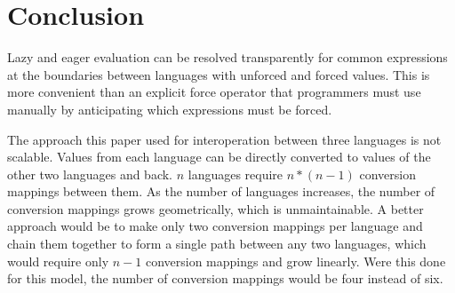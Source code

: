 \section{Conclusion}

Lazy and eager evaluation can be resolved transparently for common expressions at the boundaries between languages with unforced and forced values. This is more convenient than an explicit force operator that programmers must use manually by anticipating which expressions must be forced.

The approach this paper used for interoperation between three languages is not scalable. Values from each language can be directly converted to values of the other two languages and back. $n$ languages require $n * (n - 1)$ conversion mappings between them. As the number of languages increases, the number of conversion mappings grows geometrically, which is unmaintainable. A better approach would be to make only two conversion mappings per language and chain them together to form a single path between any two languages, which would require only $n - 1$ conversion mappings and grow linearly. Were this done for this model, the number of conversion mappings would be four instead of six.